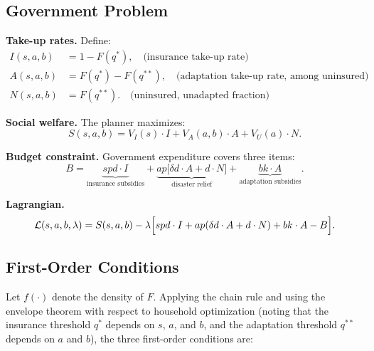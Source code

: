 \documentclass{article}
\begin{document}
\subsection{Government Problem}

\textbf{Take-up rates.} Define:
\begin{align}
    I(s,a,b) &= 1 - F(q^*), \quad\text{(insurance take-up rate)} \\
    A(s,a,b) &= F(q^*) - F(q^{**}), \quad\text{(adaptation take-up rate, among uninsured)} \\
    N(s,a,b) &= F(q^{**}). \quad\text{(uninsured, unadapted fraction)}
\end{align}

\textbf{Social welfare.} The planner maximizes:
\begin{equation}
    S(s,a,b) = V_I(s)\cdot I + V_A(a,b)\cdot A + V_U(a)\cdot N. \label{eq:welfare_discrete}
\end{equation}

\textbf{Budget constraint.} Government expenditure covers three items:
\begin{equation}
    B = \underbrace{spd\cdot I}_{\text{insurance subsidies}}
    + \underbrace{ap\bigl[\delta d\cdot A + d\cdot N\bigr]}_{\text{disaster relief}}
    + \underbrace{bk\cdot A}_{\text{adaptation subsidies}}. \label{eq:budget_discrete}
\end{equation}

\textbf{Lagrangian.}
\begin{equation}
    \mathcal{L}(s,a,b,\lambda) = S(s,a,b) - \lambda\Bigl[spd\cdot I + ap(\delta d\cdot A + d\cdot N) + bk\cdot A - B\Bigr].
\end{equation}

\subsection{First-Order Conditions}

Let $f(\cdot)$ denote the density of $F$. Applying the chain rule and using the envelope theorem with respect to household optimization (noting that the insurance threshold $q^*$ depends on $s$, $a$, and $b$, and the adaptation threshold $q^{**}$ depends on $a$ and $b$), the three first-order conditions are:
\end{document}

